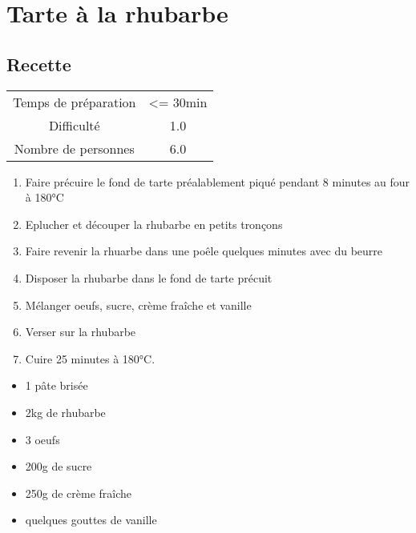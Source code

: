 \newpage
\section{Tarte à la rhubarbe}
    \label{sec:Tarte à la rhubarbe}
    \subsection{Recette}
    \vspace{1cm}


    \begin{center}
        \begin{tabular}{c|c}
            Temps de préparation & <= 30min \\
            Difficulté & 1.0 \\
            Nombre de personnes & 6.0 
        \end{tabular}
    \end{center}{}

    \vspace{1cm}
    \hline
    \vspace{1cm}

    \begin{minipage}{.7\textwidth}
        \begin{enumerate}
            \item Faire précuire le fond de tarte préalablement piqué pendant 8 minutes au four à 180°C
	    \item Eplucher et découper la rhubarbe en petits tronçons
	    \item Faire revenir la rhuarbe dans une poêle quelques minutes avec du beurre
	    \item Disposer la rhubarbe dans le fond de tarte précuit
	    \item Mélanger oeufs, sucre, crème fraîche et vanille
	    \item Verser sur la rhubarbe
	    \item Cuire 25 minutes à 180°C.

        \end{enumerate}
    \end{minipage}
    \begin{minipage}{.3\textwidth}
        \begin{flushleft}
        \begin{itemize}
            \item 1 pâte brisée
	    \item 2kg de rhubarbe
	    \item 3 oeufs
	    \item 200g de sucre
	    \item 250g de crème fraîche
	    \item quelques gouttes de vanille

        \end{itemize}
        \end{flushleft}
    \end{minipage}
    
